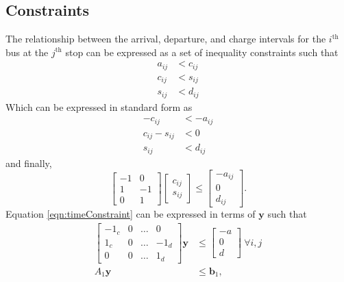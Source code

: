 \subsection{Constraints}
The relationship between the arrival, departure, and charge intervals for the $i^{\text{th}}$ bus at the $j^{\text{th}}$ stop can be expressed as a set of inequality constraints such that
\begin{equation}\begin{aligned}
	a_{ij} &< c_{ij} \\
	c_{ij} &< s_{ij} \\
	s_{ij} &< d_{ij}
\end{aligned}\end{equation}
Which can be expressed in standard form as
\begin{equation}\begin{aligned}
	-c_{ij} &< -a_{ij}\\
	c_{ij} - s_{ij} &< 0\\
	s_{ij} &< d_{ij}
\end{aligned}\end{equation}
and finally, 
\begin{equation}\label{eqn:timeConstraint}
	\begin{bmatrix} -1 & 0 \\
	                 1 & -1 \\
		0 & 1\end{bmatrix} \begin{bmatrix} c_{ij} \\ s_{ij}\end{bmatrix} \le \begin{bmatrix}-a_{ij} \\ 0 \\ d_{ij} \end{bmatrix}.
\end{equation}
	Equation \ref{eqn:timeConstraint} can be expressed in terms of $\mathbf{y}$ such that
\begin{equation} \begin{aligned}
	\begin{bmatrix}-1_c & 0 & \hdots & 0    \\
                        1_c & 0 & \hdots & -1_d \\
		0   & 0 & \hdots & 1_d \end{bmatrix}\mathbf{y} &\le \begin{bmatrix} -a \\ 0 \\ d\end{bmatrix} \ \forall i,j \\
			A_1\mathbf{y} &\le \mathbf{b}_1,
\end{aligned} \end{equation}
